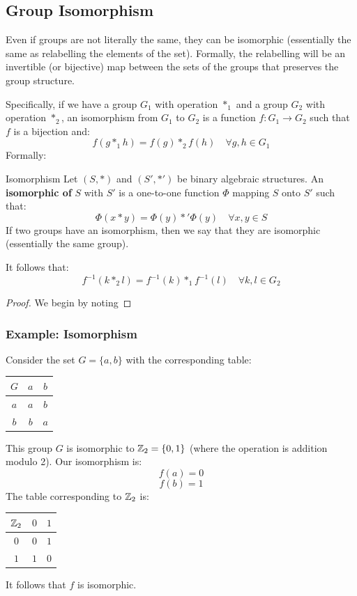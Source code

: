 \documentclass[letterpaper]{article}
\begin{document}
\subsection{Group Isomorphism}
Even if groups are not literally the same, they can be isomorphic (essentially the same as relabelling the elements of the set). Formally, the relabelling will be an invertible (or bijective) map between the sets of the groups that preserves the group structure. 

\bigskip 

Specifically, if we have a group $G_1$ with operation $*_1$ and a group $G_2$ with operation $*_2$, an isomorphism from $G_1$ to $G_2$ is a function $f: G_1 \to G_2$ such that $f$ is a bijection and:
\[f(g *_1 h) = f(g) *_2 f(h) \quad \forall g, h \in G_1\]
Formally: 
\begin{definition}{Isomorphism}{}
    Let $(S, *)$ and $(S', *')$ be binary algebraic structures. An \textbf{isomorphic of} $S$ with $S'$ is a one-to-one function $\Phi$ mapping $S$ onto $S'$ such that:
    \[\Phi(x * y) = \Phi(y) *' \Phi(y) \quad \forall x, y \in S\]
    If two groups have an isomorphism, then we say that they are isomorphic (essentially the same group). 
\end{definition}

\begin{corollary}{}{}
    It follows that:
    \[f^{-1}(k *_2 l) = f^{-1}(k) *_1 f^{-1}(l) \quad \forall k, l \in G_2\]
\end{corollary}

\begin{proof}
    We begin by noting 
\end{proof}

\subsubsection{Example: Isomorphism}
Consider the set $G = \{a, b\}$ with the corresponding table: 
\begin{center}
    \begin{tabular}{c|c c}
        $G$ & $a$ & $b$ \\ 
        \hline 
        $a$ & $a$ & $b$ \\ 
        $b$ & $b$ & $a$ 
    \end{tabular}
\end{center} 
This group $G$ is isomorphic to $\mathbb{Z}_2 = \{0, 1\}$ (where the operation is addition modulo 2). Our isomorphism is: 
\[f(a) = 0\]
\[f(b) = 1\]
The table corresponding to $\mathbb{Z}_2$ is:
\begin{center}
    \begin{tabular}{c|c c}
        $\mathbb{Z}_2$ & $0$ & $1$ \\ 
        \hline 
        $0$ & $0$ & $1$ \\ 
        $1$ & $1$ & $0$ 
    \end{tabular}
\end{center}
It follows that $f$ is isomorphic. 
\end{document}
